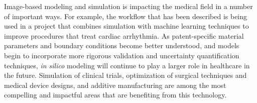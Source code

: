 Image-based modeling and simulation is impacting the medical field in a number of important ways. For example, the workflow that has been described is being used in a project that combines simulation with machine learning techniques to improve procedures that treat cardiac arrhythmia. As patent-specific material parameters and boundary conditions become better understood, and models begin to incorporate more rigorous validation and uncertainty quantification techniques, \textit{in silico} modeling will continue to play a larger role in healthcare in the future. Simulation of clinical trials, optimization of surgical techniques and medical device designs, and additive manufacturing are among the most compelling and impactful areas that are benefiting from this technology.